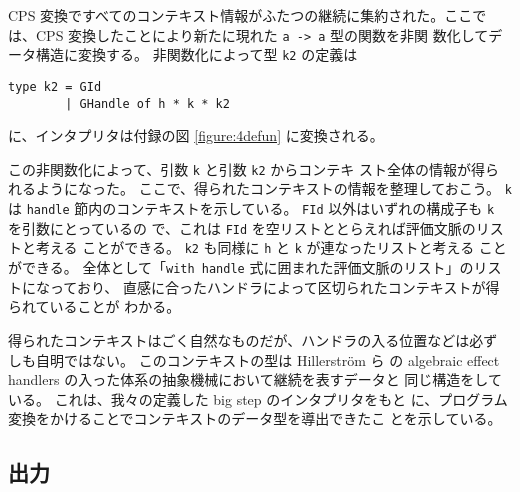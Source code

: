 CPS 変換ですべてのコンテキスト情報がふたつの継続に集約された。ここで
は、CPS 変換したことにより新たに現れた \texttt{a -> a} 型の関数を非関
数化してデータ構造に変換する。
非関数化によって型 \texttt{k2} の定義は
\vspace{-9pt}
\begin{spacing}{0.9}
\begin{verbatim}
type k2 = GId
        | GHandle of h * k * k2
\end{verbatim}
\end{spacing}
\vspace{-9pt}
に、インタプリタは付録の図 \ref{figure:4defun} に変換される。

この非関数化によって、引数 \texttt{k} と引数 \texttt{k2} からコンテキ
スト全体の情報が得られるようになった。
ここで、得られたコンテキストの情報を整理しておこう。
\texttt{k} は \texttt{handle} 節内のコンテキストを示している。
\texttt{FId} 以外はいずれの構成子も \texttt{k} を引数にとっているの
で、これは \texttt{FId} を空リストととらえれば評価文脈のリストと考える
ことができる。
\texttt{k2} も同様に \texttt{h} と \texttt{k} が連なったリストと考える
ことができる。
全体として「\texttt{with handle} 式に囲まれた評価文脈のリスト」のリストになっており、
直感に合ったハンドラによって区切られたコンテキストが得られていることが
わかる。

得られたコンテキストはごく自然なものだが、ハンドラの入る位置などは必ず
しも自明ではない。
このコンテキストの型は
Hillerstr\"{o}m ら \cite{10.1145/2976022.2976033, e6cb0c3222794e48bf38cf44e46fe4aa} の
algebraic effect handlers の入った体系の抽象機械において継続を表すデータと
同じ構造をしている。
これは、我々の定義した big step のインタプリタをもと
に、プログラム変換をかけることでコンテキストのデータ型を導出できたこ
とを示している。

\subsection{出力}
\label{subsection:memo}

